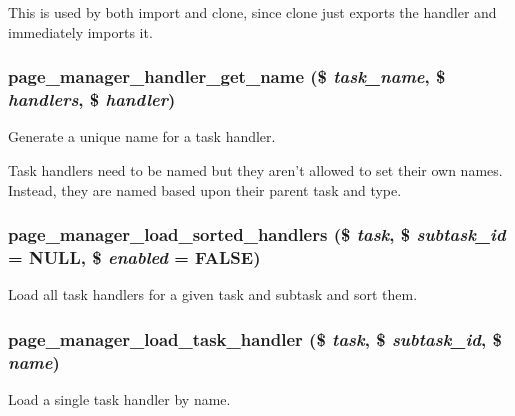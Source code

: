 This is used by both import and clone, since clone just exports the handler and immediately imports it. \hypertarget{page__manager_8module_abc975a3dfef28560a3db49a0399a930d}{
\subsubsection[{page\_\-manager\_\-handler\_\-get\_\-name}]{\setlength{\rightskip}{0pt plus 5cm}page\_\-manager\_\-handler\_\-get\_\-name (\$ {\em task\_\-name}, \/  \$ {\em handlers}, \/  \$ {\em handler})}}
\label{page__manager_8module_abc975a3dfef28560a3db49a0399a930d}
Generate a unique name for a task handler.

Task handlers need to be named but they aren't allowed to set their own names. Instead, they are named based upon their parent task and type. \hypertarget{page__manager_8module_aefe7c3f4d0d7b54cdaea1dea28d6171e}{
\subsubsection[{page\_\-manager\_\-load\_\-sorted\_\-handlers}]{\setlength{\rightskip}{0pt plus 5cm}page\_\-manager\_\-load\_\-sorted\_\-handlers (\$ {\em task}, \/  \$ {\em subtask\_\-id} = {\ttfamily NULL}, \/  \$ {\em enabled} = {\ttfamily FALSE})}}
\label{page__manager_8module_aefe7c3f4d0d7b54cdaea1dea28d6171e}
Load all task handlers for a given task and subtask and sort them. \hypertarget{page__manager_8module_a512d52ff2d441ac923a6dd5ffbff2aa5}{
\subsubsection[{page\_\-manager\_\-load\_\-task\_\-handler}]{\setlength{\rightskip}{0pt plus 5cm}page\_\-manager\_\-load\_\-task\_\-handler (\$ {\em task}, \/  \$ {\em subtask\_\-id}, \/  \$ {\em name})}}
\label{page__manager_8module_a512d52ff2d441ac923a6dd5ffbff2aa5}
Load a single task handler by name.

